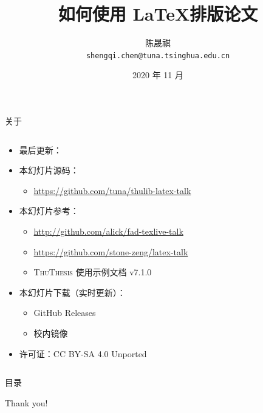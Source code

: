 \documentclass[xcolor=table,dvipsnames,svgnames,aspectratio=169,fontset=ubuntu]{ctexbeamer}
\title{如何使用 \LaTeX 排版论文}
\author[陈晟祺]{\vspace{1em} 陈晟祺\\ \texttt{shengqi.chen@tuna.tsinghua.edu.cn}}
\institute{清华大学 TUNA 协会}
\date[图书馆专题培训讲座]{2020 年 11 月}
\newcommand{\ThuThesis}{\textsc{ThuThesis}\xspace}
\newcommand\link[1]{\href{#1}{\faLink}}
\begin{document}
\begin{frame}
  \titlepage
\end{frame}


\begin{frame}{关于}
  \begin{columns}[c]
    \begin{column}{.7\textwidth}
      \begin{itemize}
        \item 最后更新：\texttt{\DTMnow}
        \item 本幻灯片源码：
          \begin{itemize}
            \item \url{https://github.com/tuna/thulib-latex-talk}
          \end{itemize}
        \item 本幻灯片参考：
          \begin{itemize}
            \item \url{http://github.com/alick/fad-texlive-talk}
            \item \url{https://github.com/stone-zeng/latex-talk}
            \item \ThuThesis{} 使用示例文档 v7.1.0
          \end{itemize}
        \item 本幻灯片下载（实时更新）：
          \begin{itemize}
            \item GitHub Releases \link{https://github.com/tuna/thulib-latex-talk/releases}
            \item 校内镜像 \link{https://stu.cs.tsinghua.edu.cn/\~harry/latex-talk.pdf}
          \end{itemize}
        \item 许可证：CC BY-SA 4.0 Unported \ccbysa
      \end{itemize}
    \end{column}
    \begin{column}{.3\textwidth}
    \end{column}
  \end{columns}
\end{frame}


\begin{frame}{目录}
  \tableofcontents
\end{frame}







\begin{frame}
  \begin{center}
    {\Huge\calligra Thank you!}
  \end{center}
\end{frame}
\end{document}
